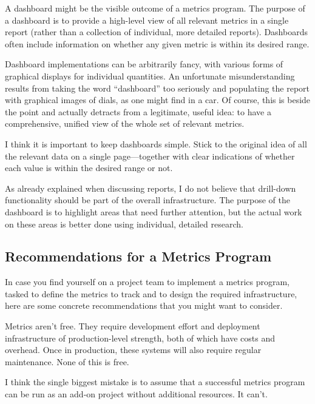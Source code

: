 A dashboard might be the visible outcome of a metrics program. The
purpose of a dashboard is to provide a high-level view of all relevant
metrics in a single report (rather than a collection of individual,
more detailed reports). Dashboards often include information on
whether any given metric is within its desired range.
    
Dashboard implementations can be arbitrarily fancy, with various forms
of graphical displays for individual quantities. An unfortunate
misunderstanding results from taking the word ``dashboard'' too
seriously and populating the report with graphical images of dials, as
one might find in a car. Of course, this is beside the point and
actually detracts from a legitimate, useful idea: to have a
comprehensive, unified view of the whole set of relevant metrics.
    
I think it is important to keep dashboards simple. Stick to the
original idea of all the relevant data on a single page---together
with clear indications of whether each value is within the desired
range or not.

As already explained when discussing reports, I do not believe that
drill-down functionality should be part of the overall\vadjust{\vfill\pagebreak}
infrastructure. The purpose of the dashboard is to highlight areas that need further
attention, but the actual work on these areas is better done using
individual, detailed research.
      
\subsection{Recommendations for a Metrics Program}
          
In case you find yourself on a project team to implement a metrics
program, tasked to define the metrics to track and to design the
required infrastructure, here are some concrete recommendations that
you might want to consider.


Metrics aren't free. They require development effort and deployment
infrastructure of production-level strength, both of which have costs
and overhead.  Once in production, these systems will also require
regular maintenance.  None of this is free.
	
I think the single biggest mistake is to assume that a successful
metrics program can be run as an add-on project without additional
resources.  It can't.


